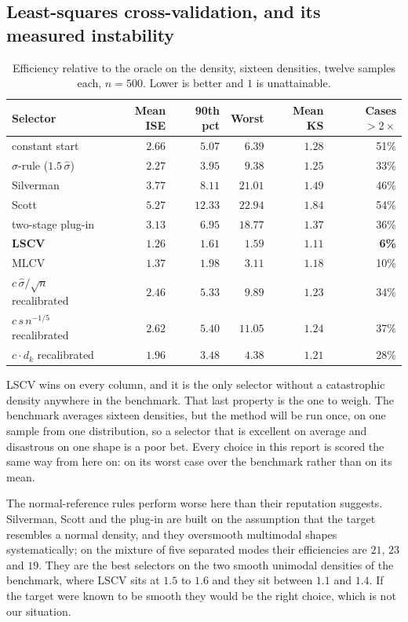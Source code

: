 \documentclass[11pt]{article}
\newcommand{\shat}{\hat{\sigma}}
\begin{document}
\subsection{Least-squares cross-validation, and its measured instability}

\begin{table}[H]
\centering
\begin{tabular}{@{}lrrrrr@{}}
\toprule
\textbf{Selector} & \textbf{Mean ISE} & \textbf{90th pct} & \textbf{Worst} &
\textbf{Mean KS} & \textbf{Cases $>2\times$} \\
\midrule
constant start & $2.66$ & $5.07$ & $6.39$ & $1.28$ & 51\% \\
$\sigma$-rule ($1.5\,\shat$) & $2.27$ & $3.95$ & $9.38$ & $1.25$ & 33\% \\
Silverman & $3.77$ & $8.11$ & $21.01$ & $1.49$ & 46\% \\
Scott & $5.27$ & $12.33$ & $22.94$ & $1.84$ & 54\% \\
two-stage plug-in & $3.13$ & $6.95$ & $18.77$ & $1.37$ & 36\% \\
\textbf{LSCV} & $\mathbf{1.26}$ & $\mathbf{1.61}$ & $\mathbf{1.59}$ & $\mathbf{1.11}$ &
  \textbf{6\%} \\
MLCV & $1.37$ & $1.98$ & $3.11$ & $1.18$ & 10\% \\
$c\,\shat/\sqrt{n}$ recalibrated & $2.46$ & $5.33$ & $9.89$ & $1.23$ & 34\% \\
$c\,s\,n^{-1/5}$ recalibrated & $2.62$ & $5.40$ & $11.05$ & $1.24$ & 37\% \\
$c \cdot d_k$ recalibrated & $1.96$ & $3.48$ & $4.38$ & $1.21$ & 28\% \\
\bottomrule
\end{tabular}
\caption{Efficiency relative to the oracle on the density, sixteen densities, twelve samples
each, $n = 500$. Lower is better and $1$ is unattainable.}
\label{tab:selector-results}
\end{table}

LSCV wins on every column, and it is the only selector without a catastrophic density
anywhere in the benchmark. That last property is the one to weigh. The benchmark averages
sixteen densities, but the method will be run once, on one sample from one distribution, so a
selector that is excellent on average and disastrous on one shape is a poor bet. Every choice
in this report is scored the same way from here on: on its worst case over the benchmark
rather than on its mean.

The normal-reference rules perform worse here than their reputation suggests. Silverman,
Scott and the plug-in are built on the assumption that the
target resembles a normal density, and they oversmooth multimodal shapes systematically; on
the mixture of five separated modes their efficiencies are $21$, $23$ and $19$. They are the
best selectors on the two smooth unimodal densities of the benchmark, where LSCV sits at
$1.5$ to $1.6$ and they sit between $1.1$ and $1.4$. If the target were known to be smooth they
would be the right choice, which is not our situation.
\end{document}
